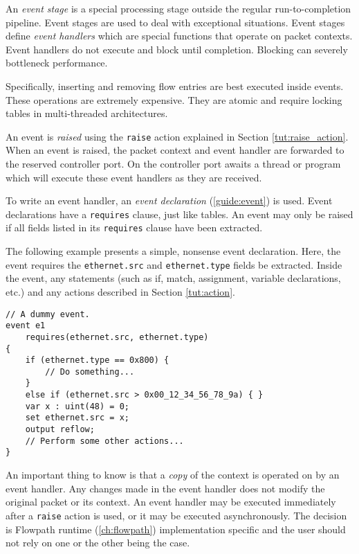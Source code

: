 An \textit{event stage} is a special processing stage outside the regular
run-to-completion pipeline. Event stages are used to deal with exceptional
situations. Event stages define \textit{event handlers} which are special
functions that operate on packet contexts. Event handlers do not execute and
block until completion. Blocking can severely bottleneck performance.

Specifically, inserting and removing flow entries are best executed inside
events. These operations are extremely expensive. They are atomic and require
locking tables in multi-threaded architectures.

An event is \textit{raised} using the \texttt{raise} action explained in Section
\ref{tut:raise_action}. When an event is raised, the packet context and event
handler are forwarded to the reserved controller port. On the controller port
awaits a thread or program which will execute these event handlers as they are
received.

To write an event handler, an \textit{event declaration}
(\ref{guide:event}) is used. Event declarations have a \texttt{requires} clause, just
like tables. An event may only be raised if all fields listed in its
\texttt{requires} clause have been extracted.

The following example presents a simple, nonsense event declaration. Here,
the event requires the \texttt{ethernet.src} and \texttt{ethernet.type} fields
be extracted. Inside the event, any statements (such as if, match,
assignment, variable declarations, etc.) and any actions described in Section
\ref{tut:action}.

\begin{codepage}
\begin{lstlisting}
// A dummy event.
event e1
	requires(ethernet.src, ethernet.type)
{
	if (ethernet.type == 0x800) {
		// Do something...
	}
	else if (ethernet.src > 0x00_12_34_56_78_9a) { }
	var x : uint(48) = 0;
	set ethernet.src = x;
	output reflow;
	// Perform some other actions...
}
\end{lstlisting}
\end{codepage}

An important thing to know is that a \textit{copy} of the context is operated on
by an event handler. Any changes made in the event handler does not modify the
original packet or its context. An event handler may be executed immediately
after a \texttt{raise} action is used, or it may be executed asynchronously. The decision
is Flowpath runtime (\ref{ch:flowpath}) implementation specific and the user should not
rely on one or the other being the case.

